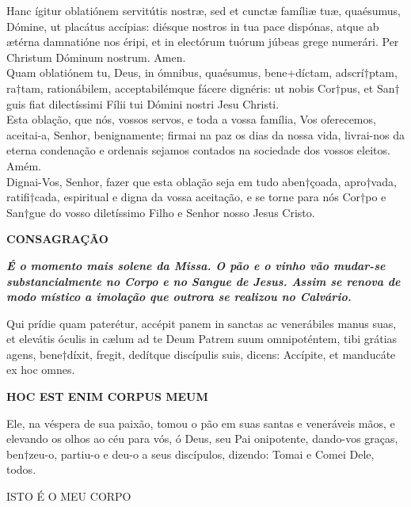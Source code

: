 \begin{multicols}{2}
	\noindent Hanc ígitur oblatiónem servitútis nostræ, sed et cunctæ famíliæ tuæ, quaésumus, Dómine, ut placátus accípias: diésque nostros in tua pace dispónas, atque ab ætérna damnatióne nos éripi, et in electórum tuórum júbeas grege numerári. Per Christum Dóminum nostrum. Amen.
	\\Quam oblatiónem tu, Deus, in ómnibus, quaésumus, bene+díctam, adscrí$\dagger$ptam, ra$\dagger$tam, rationábilem, acceptabilémque fácere dignéris: ut nobis Cor$\dagger$pus, et San$\dagger$guis fiat dilectíssimi Fílii tui Dómini nostri Jesu Christi. 
	\\Esta oblação, que nós, vossos servos, e toda a vossa família, Vos oferecemos, aceitai-a, Senhor, benignamente; firmai na paz os dias da nossa vida, livrai-nos da eterna condenação e ordenais sejamos contados na sociedade dos vossos eleitos. Amém.
	\\Dignai-Vos, Senhor, fazer que esta oblação seja em tudo aben$\dagger$çoada, apro$\dagger$vada, ratifi$\dagger$cada, espiritual e digna da vossa aceitação, e se torne para nós Cor$\dagger$po e San$\dagger$gue do vosso diletíssimo Filho e Senhor nosso Jesus Cristo.
\end{multicols}
\newpage
\begin{center}
	\textbf{CONSAGRAÇÃO}
\end{center}
\begin{flushleft}
	\textbf{\textit{É o momento mais solene da Missa. O pão e o vinho vão mudar-se substancialmente no Corpo e no Sangue de Jesus. Assim se renova de modo místico a imolação que outrora se realizou no Calvário.}}
\end{flushleft}
\begin{multicols}{2}
	\noindent Qui prídie quam paterétur, accépit panem in sanctas ac venerábiles manus suas, et elevátis óculis in cælum ad te Deum Patrem suum omnipoténtem, tibi grátias agens, bene$\dag$díxit, fregit, dedítque discípulis suis, dicens: Accípite, et manducáte ex hoc omnes.	
	\begin{center}
		\textbf{HOC EST ENIM CORPUS MEUM}
	\end{center}
	Ele, na véspera de sua paixão, tomou o pão em suas santas e veneráveis mãos, e elevando os olhos ao céu para vós, ó Deus, seu Pai onipotente, dando-vos graças, ben$\dag$zeu-o, partiu-o e deu-o a seus discípulos, dizendo: Tomai e Comei Dele, todos.
	\begin{center}
		ISTO É O MEU CORPO
	\end{center} 
\end{multicols}
